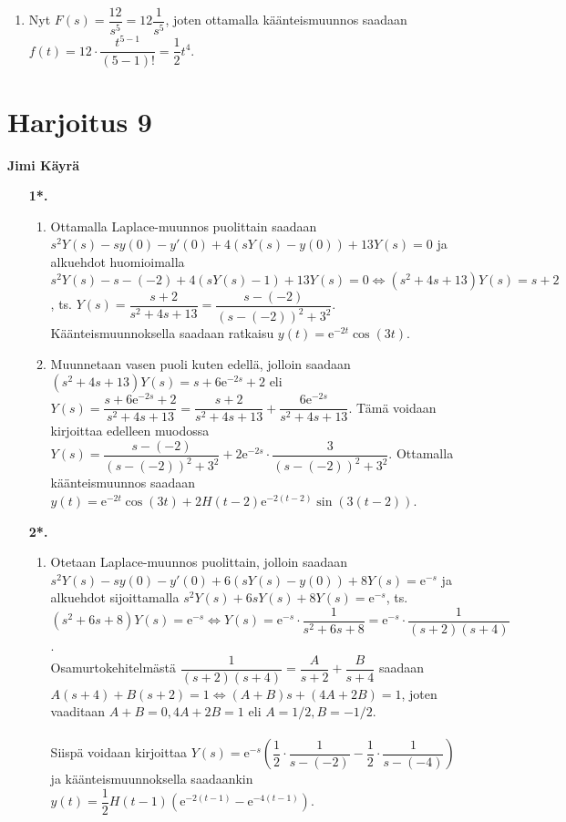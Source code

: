 \documentclass[12pt,fleqn]{article}
\begin{document}
\begin{enumerate}[label=\textbf{\arabic*.}]
\begin{enumerate}[label=\textbf{\alph*)}]
\item Nyt \(F(s)=\dfrac{12}{s^5}=12\dfrac{1}{s^5}\), joten ottamalla käänteismuunnos saadaan \(f(t)=12\cdot \dfrac{t^{5-1}}{(5-1)!}=\dfrac{1}{2}t^4\).



\end{enumerate}
\end{enumerate}

\newpage
\section*{Harjoitus 9}
\textbf{Jimi Käyrä}
\begin{enumerate}[label=\textbf{\arabic*.}]
\item [\textbf{1*.}]
\begin{enumerate}[label=\textbf{\alph*)}]
\item Ottamalla Laplace-muunnos puolittain saadaan\\ \(s^2 Y(s)-sy(0)-y'(0)+4(sY(s)-y(0))+13Y(s)=0\) ja alkuehdot huomioimalla \(s^2 Y(s)-s-(-2)+4(sY(s)-1)+13Y(s)=0 \iff (s^2+4s+13)Y(s)=s+2\), ts. \(Y(s)=\dfrac{s+2}{s^2+4s+13}=\dfrac{s-(-2)}{(s-(-2))^2+3^2}\).\\ Käänteismuunnoksella saadaan ratkaisu \(y(t)=\text{e}^{-2t}\cos (3t)\).

\item Muunnetaan vasen puoli kuten edellä, jolloin saadaan \((s^2+4s+13)Y(s)=s+6\text{e}^{-2s}+2\) eli \(Y(s)=\dfrac{s+6\text{e}^{-2s}+2}{s^2+4s+13}=\dfrac{s+2}{s^2+4s+13}+\dfrac{6\text{e}^{-2s}}{s^2+4s+13}\). Tämä voidaan kirjoittaa edelleen muodossa \(Y(s)=\dfrac{s-(-2)}{(s-(-2))^2+3^2}+2\text{e}^{-2s}\cdot \dfrac{3}{(s-(-2))^2+3^2}\). Ottamalla käänteismuunnos saadaan \(y(t)=\text{e}^{-2t}\cos (3t)+2H(t-2)\text{e}^{-2(t-2)} \sin (3(t-2))\).
\end{enumerate}

\item [\textbf{2*.}]
\begin{enumerate}[label=\textbf{\alph*)}]
\item Otetaan Laplace-muunnos puolittain, jolloin saadaan \(s^2 Y(s)-sy(0)-y'(0)+6(sY(s)-y(0))+8Y(s)=\text{e}^{-s}\) ja alkuehdot sijoittamalla \(s^2 Y(s)+6s Y(s)+8Y(s)=\text{e}^{-s}\), ts. \((s^2+6s+8)Y(s)=\text{e}^{-s}\iff Y(s)=\text{e}^{-s}\cdot \dfrac{1}{s^2+6s+8}=\text{e}^{-s} \cdot \dfrac{1}{(s+2)(s+4)}\).\\
Osamurtokehitelmästä \(\dfrac{1}{(s+2)(s+4)}=\dfrac{A}{s+2}+\dfrac{B}{s+4}\) saadaan \(A(s+4)+B(s+2)=1\iff (A+B)s+(4A+2B)=1\), joten vaaditaan \(A+B=0, 4A+2B=1\) eli \(A=1/2, B=-1/2\).\\
 \\
Siispä voidaan kirjoittaa \(Y(s)=\text{e}^{-s}\left ( \dfrac{1}{2}\cdot \dfrac{1}{s-(-2)}-\dfrac{1}{2}\cdot \dfrac{1}{s-(-4)} \right )\) ja käänteismuunnoksella saadaankin \(y(t)=\dfrac{1}{2} H(t-1) (\text{e}^{-2(t-1)}-\text{e}^{-4(t-1)})\).


\end{enumerate}
\end{enumerate}
\end{document}
